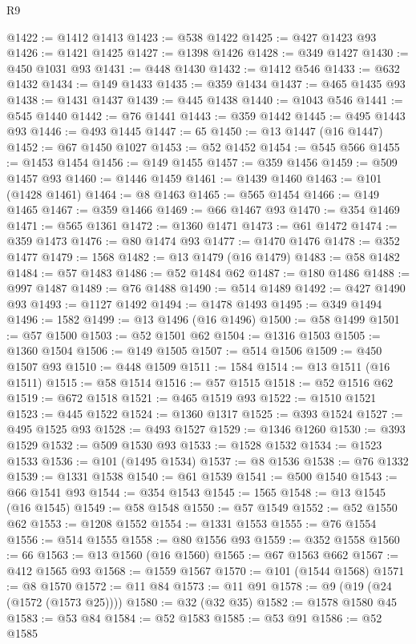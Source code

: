 \begin{lexlean}{R9}
\begin{coremodule}
@1422 := @1412 @1413
@1423 := @538 @1422
@1425 := @427 @1423 @93
@1426 := @1421 @1425
@1427 := @1398 @1426
@1428 := @349 @1427
@1430 := @450 @1031 @93
@1431 := @448 @1430
@1432 := @1412 @546
@1433 := @632 @1432
@1434 := @149 @1433
@1435 := @359 @1434
@1437 := @465 @1435 @93
@1438 := @1431 @1437
@1439 := @445 @1438
@1440 := @1043 @546
@1441 := @545 @1440
@1442 := @76 @1441
@1443 := @359 @1442
@1445 := @495 @1443 @93
@1446 := @493 @1445
@1447 := 65
@1450 := @13 @1447 (@16 @1447)
@1452 := @67 @1450 @1027
@1453 := @52 @1452
@1454 := @545 @566
@1455 := @1453 @1454
@1456 := @149 @1455
@1457 := @359 @1456
@1459 := @509 @1457 @93
@1460 := @1446 @1459
@1461 := @1439 @1460
@1463 := @101 (@1428 @1461)
@1464 := @8 @1463
@1465 := @565 @1454
@1466 := @149 @1465
@1467 := @359 @1466
@1469 := @66 @1467 @93
@1470 := @354 @1469
@1471 := @565 @1361
@1472 := @1360 @1471
@1473 := @61 @1472
@1474 := @359 @1473
@1476 := @80 @1474 @93
@1477 := @1470 @1476
@1478 := @352 @1477
@1479 := 1568
@1482 := @13 @1479 (@16 @1479)
@1483 := @58 @1482
@1484 := @57 @1483
@1486 := @52 @1484 @62
@1487 := @180 @1486
@1488 := @997 @1487
@1489 := @76 @1488
@1490 := @514 @1489
@1492 := @427 @1490 @93
@1493 := @1127 @1492
@1494 := @1478 @1493
@1495 := @349 @1494
@1496 := 1582
@1499 := @13 @1496 (@16 @1496)
@1500 := @58 @1499
@1501 := @57 @1500
@1503 := @52 @1501 @62
@1504 := @1316 @1503
@1505 := @1360 @1504
@1506 := @149 @1505
@1507 := @514 @1506
@1509 := @450 @1507 @93
@1510 := @448 @1509
@1511 := 1584
@1514 := @13 @1511 (@16 @1511)
@1515 := @58 @1514
@1516 := @57 @1515
@1518 := @52 @1516 @62
@1519 := @672 @1518
@1521 := @465 @1519 @93
@1522 := @1510 @1521
@1523 := @445 @1522
@1524 := @1360 @1317
@1525 := @393 @1524
@1527 := @495 @1525 @93
@1528 := @493 @1527
@1529 := @1346 @1260
@1530 := @393 @1529
@1532 := @509 @1530 @93
@1533 := @1528 @1532
@1534 := @1523 @1533
@1536 := @101 (@1495 @1534)
@1537 := @8 @1536
@1538 := @76 @1332
@1539 := @1331 @1538
@1540 := @61 @1539
@1541 := @500 @1540
@1543 := @66 @1541 @93
@1544 := @354 @1543
@1545 := 1565
@1548 := @13 @1545 (@16 @1545)
@1549 := @58 @1548
@1550 := @57 @1549
@1552 := @52 @1550 @62
@1553 := @1208 @1552
@1554 := @1331 @1553
@1555 := @76 @1554
@1556 := @514 @1555
@1558 := @80 @1556 @93
@1559 := @352 @1558
@1560 := 66
@1563 := @13 @1560 (@16 @1560)
@1565 := @67 @1563 @662
@1567 := @412 @1565 @93
@1568 := @1559 @1567
@1570 := @101 (@1544 @1568)
@1571 := @8 @1570
@1572 := @11 @84
@1573 := @11 @91
@1578 := @9 (@19 (@24 (@1572 (@1573 @25))))
@1580 := @32 (@32 @35)
@1582 := @1578 @1580 @45
@1583 := @53 @84
@1584 := @52 @1583
@1585 := @53 @91
@1586 := @52 @1585

\end{coremodule}
\end{lexlean}
